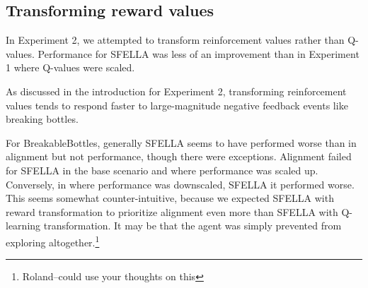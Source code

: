 



\subsection{Transforming reward values}

In Experiment 2, we attempted to transform reinforcement values rather than Q-values. Performance for SFELLA was less of an improvement than in Experiment 1 where Q-values were scaled.

As discussed in the introduction for Experiment 2, transforming reinforcement values tends to respond faster to large-magnitude negative feedback events like breaking bottles. 

For BreakableBottles, generally SFELLA seems to have performed worse than \tloA{} in alignment but not performance, though there were exceptions. Alignment failed for SFELLA in the base scenario and where performance was scaled up. Conversely, in where performance was downscaled, SFELLA it performed worse. This seems somewhat counter-intuitive, because we expected SFELLA with reward transformation to prioritize alignment even more than SFELLA with Q-learning transformation. It may be that the agent was simply prevented from exploring altogether.\footnote{Roland--could use your thoughts on this}



